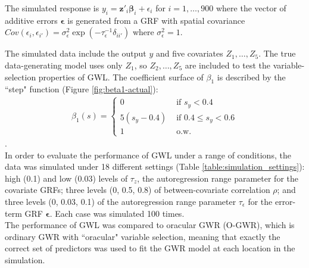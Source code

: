 \documentclass[authoryear, review, 11pt]{elsarticle}
\begin{document}
	The simulated response is $y_i = \bm{z}'_i \bm{\beta}_i + \epsilon_i$ for $i=1, \dots, 900$ where the vector of additive errors $\bm{\epsilon}$ is generated from a GRF with spatial covariance $Cov \left(\epsilon_{i}, \epsilon_{i'} \right) = \sigma_{\epsilon}^2 \exp{\left( -\tau_{\epsilon}^{-1} \delta_{ii'} \right)}$ where $\sigma_{\epsilon}^2=1$.
	
	The simulated data include the output $y$ and five covariates $Z_1, \dots, Z_5$. The true data-generating model uses only $Z_1$, so $Z_2, \dots, Z_5$ are included to test the variable-selection properties of GWL. The coefficient surface of $\beta_1$ is described by the ``step" function (Figure \ref{fig:beta1-actual}):
	\begin{eqnarray}
		\beta_1(s) = \begin{cases} 0 &\mbox{ if } s_y<0.4 \\ 5(s_y-0.4) &\mbox{ if } 0.4 \leq s_y<0.6 \\ 1 &\mbox{ o.w.} \end{cases}
	\end{eqnarray}.\\
		
	In order to evaluate the performance of GWL under a range of conditions, the data was simulated under 18 different settings (Table \ref{table:simulation_settings}): high (0.1) and low (0.03) levels of $\tau_z$, the autoregression range parameter for the covariate GRFs; three levels (0, 0.5, 0.8) of between-covariate correlation $\rho$; and three levels (0, 0.03, 0.1) of the autoregression range parameter $\tau_{\epsilon}$ for the error-term GRF $\bm{\epsilon}$. Each case was simulated 100 times.\\
		
	The performance of GWL was compared to oracular GWR (O-GWR), which is ordinary GWR with ``oracular" variable selection, meaning that exactly the correct set of predictors was used to fit the GWR model at each location in the simulation.\\
	
\end{document}
